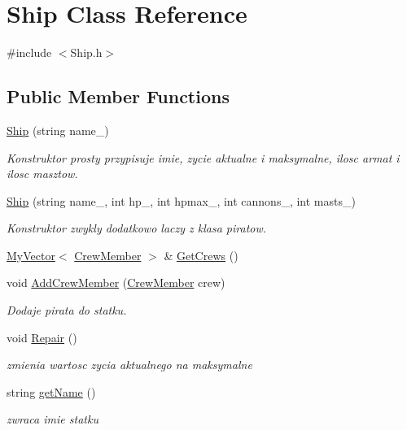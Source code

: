 \hypertarget{class_ship}{}\section{Ship Class Reference}
\label{class_ship}


{\ttfamily \#include $<$Ship.\+h$>$}

\subsection*{Public Member Functions}
\begin{DoxyCompactItemize}
\item 
\hyperlink{class_ship_a53f9329606690e48ed1ff3543fa4ae3e}{Ship} (string name\+\_\+)
\begin{DoxyCompactList}\small\item\em Konstruktor prosty przypisuje imie, zycie aktualne i maksymalne, ilosc armat i ilosc masztow. \end{DoxyCompactList}\item 
\hyperlink{class_ship_abb6276e9a6bfab2e74a2a74eda0fa705}{Ship} (string name\+\_\+, int hp\+\_\+, int hpmax\+\_\+, int cannons\+\_\+, int masts\+\_\+)
\begin{DoxyCompactList}\small\item\em Konstruktor zwykly dodatkowo laczy z klasa piratow. \end{DoxyCompactList}\item 
\hyperlink{class_my_vector}{My\+Vector}$<$ \hyperlink{class_crew_member}{Crew\+Member} $>$ \& \hyperlink{class_ship_a2e898baf9c4999fd2a2b14802aabc893}{Get\+Crews} ()
\item 
void \hyperlink{class_ship_a8e6cb2f38ab78b23ad63c8805829fe4a}{Add\+Crew\+Member} (\hyperlink{class_crew_member}{Crew\+Member} crew)
\begin{DoxyCompactList}\small\item\em Dodaje pirata do statku. \end{DoxyCompactList}\item 
void \hyperlink{class_ship_a1046a0f2b87a03252ffc13582880cc11}{Repair} ()
\begin{DoxyCompactList}\small\item\em zmienia wartosc zycia aktualnego na maksymalne \end{DoxyCompactList}\item 
string \hyperlink{class_ship_a70faa1b6274d9b9303d263e51071b29a}{get\+Name} ()
\begin{DoxyCompactList}\small\item\em zwraca imie statku \end{DoxyCompactList}\item 

\end{DoxyCompactItemize}
